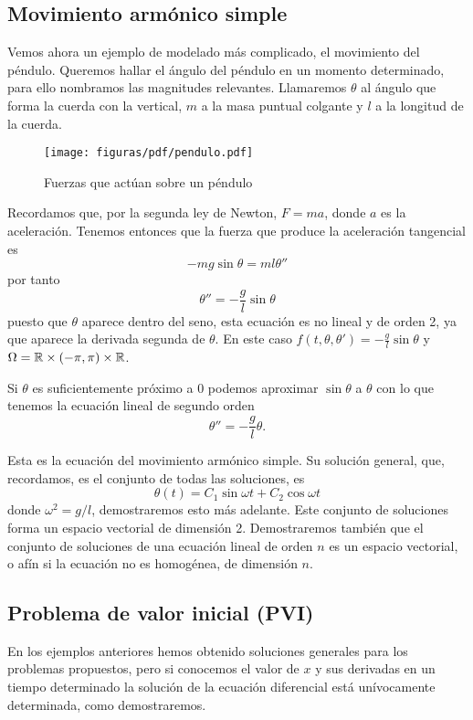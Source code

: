 \documentclass[../ecuaciones_diferenciales.tex]{subfiles}
\begin{document}
\subsection{Movimiento armónico simple} 

Vemos ahora un ejemplo de modelado más complicado, el movimiento del péndulo.
Queremos hallar el ángulo del péndulo en un momento determinado, para ello
nombramos las magnitudes relevantes. Llamaremos \(\theta\) al ángulo que forma
la cuerda con la vertical, \(m\) a la masa puntual colgante y \(l\) a la
longitud de la cuerda.

\begin{figure}[ht]
	\centering
	\texttt{[image: figuras/pdf/pendulo.pdf]}
	\caption{Fuerzas que actúan sobre un péndulo}
	\label{fig:pendulo}
\end{figure}

Recordamos que, por la segunda ley de Newton, \(F = ma\), donde \(a\) es la
aceleración. Tenemos entonces que la fuerza que produce la aceleración
tangencial es
\[-m g \sin\theta = m l \theta''\]
por tanto
\[\theta'' = -\frac{g}{l} \sin\theta\]
puesto que \(\theta\) aparece dentro del seno, esta ecuación es no lineal y de
orden 2, ya que aparece la derivada segunda de \(\theta\). En este caso
\(f(t, \theta, \theta') = -\frac{g}{l} \sin\theta\) y \(\Omega = \mathbb{R} \times
(-\pi, \pi) \times \mathbb{R}\). 

Si \(\theta\) es suficientemente próximo a \(0\) podemos aproximar 
\(\sin\theta\) a \(\theta\) con lo que tenemos la ecuación
lineal de segundo orden
\[\theta'' = -\frac{g}{l}\theta.\]

Esta es la ecuación del movimiento armónico simple. Su solución general, que,
recordamos, es el conjunto de todas las soluciones, es
\[\theta(t) = C_1 \sin \omega t + C_2 \cos \omega t\]
donde \(\omega^2 = g/l\), demostraremos esto más adelante. Este conjunto de
soluciones forma un espacio vectorial de dimensión 2. Demostraremos también que
el conjunto de soluciones de una ecuación lineal de orden \(n\) es un espacio
vectorial, o afín si la ecuación no es homogénea, de dimensión \(n\).

\subsection{Problema de valor inicial (PVI)}

En los ejemplos anteriores hemos obtenido soluciones generales para los
problemas propuestos, pero si conocemos el valor de \(x\) y sus derivadas en un
tiempo determinado la solución de la ecuación diferencial está
unívocamente determinada, como demostraremos.
\end{document}
